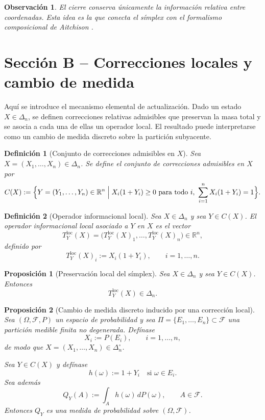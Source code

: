 ﻿\documentclass[12pt]{article}
\newtheorem{definicion}{Definición}[section]
\newtheorem{proposicion}{Proposición}[section]
\newtheorem{observacion}{Observación}[section]
\begin{document}
\begin{observacion}
El cierre conserva únicamente la información relativa entre coordenadas. Esta idea es la que conecta el símplex con el formalismo composicional de Aitchison \citep{Aitchison1986}.
\end{observacion}

\section{Sección B -- Correcciones locales y cambio de medida}

Aquí se introduce el mecanismo elemental de actualización. Dado un estado $X\in\Delta_n$, se definen correcciones relativas admisibles que preservan la masa total y se asocia a cada una de ellas un operador local. El resultado puede interpretarse como un cambio de medida discreto sobre la partición subyacente.

\begin{definicion}[Conjunto de correcciones admisibles en $X$]\label{def:CX}
Sea $X=(X_1,\dots,X_n)\in\Delta_n$. Se define el \emph{conjunto de correcciones admisibles en $X$} por
\[
C(X)
:=
\Bigl\{
Y=(Y_1,\dots,Y_n)\in\mathbb{R}^n
\;\Big|\;
X_i(1+Y_i)\ge 0\ \text{para todo } i,\ 
\sum_{i=1}^n X_i(1+Y_i)=1
\Bigr\}.
\]
\end{definicion}

\begin{definicion}[Operador informacional local]\label{def:Tloc}
Sea $X\in\Delta_n$ y sea $Y\in C(X)$. El \emph{operador informacional local} asociado a $Y$ en $X$ es el vector
\[
T_Y^{\mathrm{loc}}(X)
=
\bigl(T_Y^{\mathrm{loc}}(X)_1,\dots,T_Y^{\mathrm{loc}}(X)_n\bigr)\in\mathbb{R}^n,
\]
definido por
\[
T_Y^{\mathrm{loc}}(X)_i:=X_i(1+Y_i),\qquad i=1,\dots,n.
\]
\end{definicion}

\begin{proposicion}[Preservación local del símplex]\label{prop:preservacionLocal}
Sea $X\in\Delta_n$ y sea $Y\in C(X)$. Entonces
\[
T_Y^{\mathrm{loc}}(X)\in\Delta_n.
\]
\end{proposicion}

\begin{proposicion}[Cambio de medida discreto inducido por una corrección local]\label{prop:QYprobabilidad}
Sea $(\Omega,\mathcal F,P)$ un espacio de probabilidad y sea $\Pi=\{E_1,\dots,E_n\}\subset\mathcal F$ una partición medible finita no degenerada. Defínase
\[
X_i:=P(E_i),\qquad i=1,\dots,n,
\]
de modo que $X=(X_1,\dots,X_n)\in\Delta_n^\circ$.

Sea $Y\in C(X)$ y defínase
\[
h(\omega):=1+Y_i
\quad\text{si }\omega\in E_i.
\]
Sea además
\[
Q_Y(A):=\int_A h(\omega)\,dP(\omega),\qquad A\in\mathcal F.
\]
Entonces $Q_Y$ es una medida de probabilidad sobre $(\Omega,\mathcal F)$.
\end{proposicion}
\end{document}
